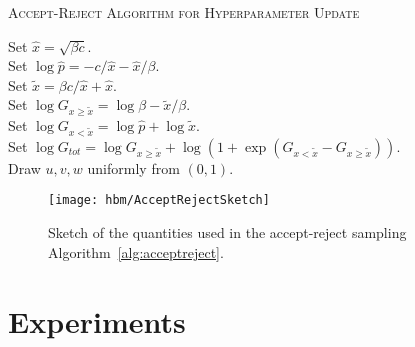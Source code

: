 {\fontsize{4}{4}\selectfont
\begin{algorithm}[t]
\caption{\textsc{Accept-Reject Algorithm for Hyperparameter Update}}
Set $\hat x = \sqrt{\beta c}$.\\
Set $\log \hat p = -c/\hat x - \hat x/\beta$.\\
Set $\tilde{x} = \beta c/\hat x + \hat x$.\\
Set $\log G_{x\geqslant \tilde{x}} = \log \beta - \tilde{x}/\beta$.\\
Set $\log G_{x < \tilde{x}} = \log \hat p + \log \tilde{x}$. \\
Set $\log G_{tot} = \log G_{x\geqslant \tilde{x}} + \log\left(1 + \exp\left(G_{x < \tilde{x}} - G_{x\geqslant \tilde{x}}  \right)\right)$.\\
    {
    Draw $u, v, w$ uniformly from $\left(0,1\right)$.\\
    }
\label{alg:acceptreject}
\end{algorithm}
}

\begin{figure}[tb]
   \centering
\texttt{[image: hbm/AcceptRejectSketch]}
\caption{Sketch of the quantities used in the accept-reject sampling Algorithm~\ref{alg:acceptreject}.}
   \label{fig:AccRejSketch}
\end{figure}



\section{Experiments}

